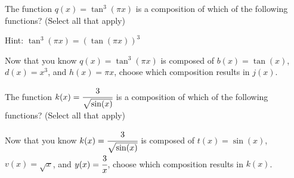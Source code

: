 \documentclass{ximera}
\begin{document}
\begin{problem}

    The function $q(x) = \tan^3(\pi x)$ is a composition of which of the following functions?  (Select all that apply)
    
    \begin{hint}
    
    Hint: $\tan^3(\pi x) = \left(\tan(\pi x)\right)^3$
    
    \end{hint}
    
        \begin{selectAll}
        \end{selectAll}
        
    \begin{problem}
        Now that you know $q(x) = \tan^3(\pi x)$ is composed of $b(x) = \tan(x)$, $d(x) = x^3$, and $h(x) = \pi x$, choose which composition results in $j(x)$. 
        
            \begin{multipleChoice}
            \end{multipleChoice}
    \end{problem}
\end{problem}
    
\begin{problem}

    The function $k(x) = \cfrac{3}{\sqrt{\sin(x)}}$ is a composition of which of the following functions?  (Select all that apply)
    
        \begin{selectAll}
        \end{selectAll}
        
    \begin{problem}
        Now that you know $k(x) = \cfrac{3}{\sqrt{\sin(x)}}$ is composed of $t(x) = \sin(x)$, $v(x) = \sqrt{x}$, and $y(x) = \cfrac{3}{x}$, choose which composition results in $k(x)$. 
        
            \begin{multipleChoice}
            \end{multipleChoice}
    \end{problem}

\end{problem}
\end{document}
